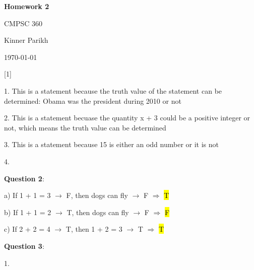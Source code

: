 \documentclass{article} %
\newcommand{\question}[2][]{\begin{flushleft}
        \textbf{Question #1}: \textit{#2}

\end{flushleft}}
\newcommand{\maketitletwo}[2][]{\begin{center}
        \Large{\textbf{Homework #1}
            
            CMPSC 360} %
        \vspace{5pt}
        
        \normalsize{Kinner Parikh  %
        
        \today}        %
        \vspace{15pt}
        
\end{center}}
\begin{document}
    \maketitletwo[2]  %
    
    \question[1]{}
    
    1. This is a statement because the truth value of the statement can be determined: Obama was the president during 2010 or not

    2. This is a statement becuase the quantity x + 3 could be a positive integer or not, which means the truth value can be determined

    3. This is a statement because 15 is either an odd number or it is not

    4. 

    \question[2]{}

    a) If 1 + 1 = 3 $\rightarrow$ F, then dogs can fly $\rightarrow$ F $\Rightarrow$  \hl{T}

    b) If 1 + 1 = 2 $\rightarrow$ T, then dogs can fly $\rightarrow$ F $\Rightarrow$  \hl{F}

    c) If 2 + 2 = 4 $\rightarrow$ T, then 1 + 2 = 3 $\rightarrow$ T $\Rightarrow$  \hl{T}

    \question[3]{}

    1. 
\end{document}

